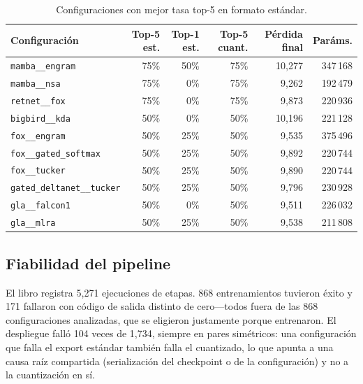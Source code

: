 \begin{table}[H]
\centering
\small
\caption{Configuraciones con mejor tasa top-5 en formato estándar.}
\label{tab:r2-inference}
\begin{tabular}{lrrrrr}
\toprule
Configuración & Top-5 est. & Top-1 est. & Top-5 cuant. & Pérdida final & Paráms. \\
\midrule
\texttt{mamba\_\_engram} & 75\% & 50\% & 75\% & 10,277 & 347\,168 \\
\texttt{mamba\_\_nsa}    & 75\% & 0\%  & 75\% & 9,262  & 192\,479 \\
\texttt{retnet\_\_fox}  & 75\% & 0\%  & 75\% & 9,873  & 220\,936 \\
\texttt{bigbird\_\_kda}  & 50\% & 0\%  & 50\% & 10,196 & 221\,128 \\
\texttt{fox\_\_engram}   & 50\% & 25\% & 50\% & 9,535  & 375\,496 \\
\texttt{fox\_\_gated\_softmax} & 50\% & 25\% & 50\% & 9,892 & 220\,744 \\
\texttt{fox\_\_tucker}   & 50\% & 25\% & 50\% & 9,890  & 220\,744 \\
\texttt{gated\_deltanet\_\_tucker} & 50\% & 25\% & 50\% & 9,796 & 230\,928 \\
\texttt{gla\_\_falcon1}  & 50\% & 0\%  & 50\% & 9,511  & 226\,032 \\
\texttt{gla\_\_mlra}     & 50\% & 25\% & 50\% & 9,538  & 211\,808 \\
\bottomrule
\end{tabular}
\end{table}

\subsection{Fiabilidad del pipeline}

El libro registra 5{,}271 ejecuciones de etapas. 868 entrenamientos tuvieron éxito y 171 fallaron con código de salida distinto de cero---todos fuera de las 868 configuraciones analizadas, que se eligieron justamente porque entrenaron. El despliegue falló 104 veces de 1{,}734, siempre en pares simétricos: una configuración que falla el export estándar también falla el cuantizado, lo que apunta a una causa raíz compartida (serialización del checkpoint o de la configuración) y no a la cuantización en sí.

